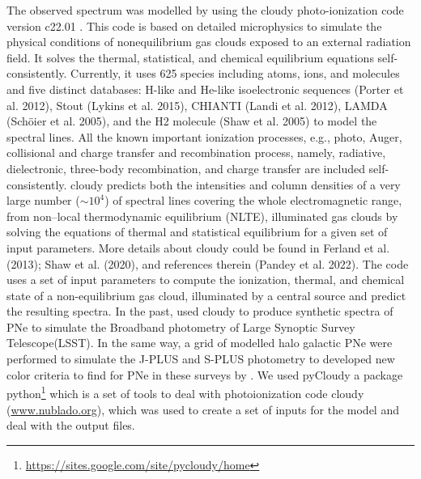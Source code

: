 \documentclass[fleqn,usenatbib]{mnras}
\begin{document}
{The observed spectrum was modelled by using the {\sc cloudy} photo-ionization code version
c22.01 \citep{Ferland:2017}. This
code is based on detailed microphysics to simulate the physical
conditions of nonequilibrium gas clouds exposed to an external
radiation field. It solves the thermal, statistical, and chemical
equilibrium equations self-consistently. Currently, it uses 625
species including atoms, ions, and molecules and five distinct
databases: H-like and He-like isoelectronic sequences (Porter
et al. 2012), Stout (Lykins et al. 2015), CHIANTI (Landi et al.
2012), LAMDA (Schöier et al. 2005), and the H2 molecule
(Shaw et al. 2005) to model the spectral lines. All the known
important ionization processes, e.g., photo, Auger, collisional
and charge transfer and recombination process, namely,
radiative, dielectronic, three-body recombination, and charge
transfer are included self-consistently. {\sc cloudy} predicts both
the intensities and column densities of a very large number
($\sim 10^{4}$) of spectral lines covering the whole electromagnetic
range, from non–local thermodynamic equilibrium (NLTE),
illuminated gas clouds by solving the equations of thermal and
statistical equilibrium for a given set of input parameters. More
details about {\sc cloudy} could be found in Ferland et al. (2013);
Shaw et al. (2020), and references therein (Pandey et al. 2022).
The code uses a set of input parameters to compute the
ionization, thermal, and chemical state of a non-equilibrium gas cloud,
illuminated by a central source and predict the resulting spectra. 
In the past, \citet{Vejar:2019} used {\sc cloudy} to produce
synthetic spectra of PNe to simulate the  Broadband photometry
of Large Synoptic Survey Telescope(LSST). In the same way, a grid of modelled
halo galactic PNe were performed to simulate the J-PLUS and S-PLUS photometry
to developed new color criteria to find for PNe in these surveys by \citet{Gutierrez-Soto:2020}.
We used {\sc pyCloudy} \citep{Morisset:2013} a
package python\footnote{\url{https://sites.google.com/site/pycloudy/home}} which
is a set of tools to deal with photoionization code {\sc cloudy} (\url{www.nublado.org}),
which was used to create a set of inputs for the model and deal with the output files.

}
\end{document}

